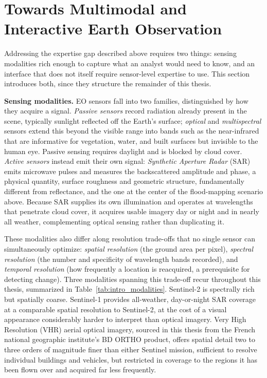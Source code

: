\section{Towards Multimodal and Interactive Earth Observation}
\label{sec:intro_multimodal_interactive}
 
Addressing the expertise gap described above requires two things: sensing modalities rich enough to capture what an analyst would need to know, and an interface that does not itself require sensor-level expertise to use. This section introduces both, since they structure the remainder of this thesis.
 
\textbf{Sensing modalities.} EO sensors fall into two families, distinguished by how they acquire a signal. \textit{Passive sensors} record radiation already present in the scene, typically sunlight reflected off the Earth's surface; \textit{optical} and \textit{multispectral} sensors extend this beyond the visible range into bands such as the near-infrared that are informative for vegetation, water, and built surfaces but invisible to the human eye. Passive sensing requires daylight and is blocked by cloud cover. \textit{Active sensors} instead emit their own signal: \textit{Synthetic Aperture Radar} (SAR) emits microwave pulses and measures the backscattered amplitude and phase, a physical quantity, surface roughness and geometric structure, fundamentally different from reflectance, and the one at the center of the flood-mapping scenario above. Because SAR supplies its own illumination and operates at wavelengths that penetrate cloud cover, it acquires usable imagery day or night and in nearly all weather, complementing optical sensing rather than duplicating it.
 
These modalities also differ along resolution trade-offs that no single sensor can simultaneously optimize: \textit{spatial resolution} (the ground area per pixel), \textit{spectral resolution} (the number and specificity of wavelength bands recorded), and \textit{temporal resolution} (how frequently a location is reacquired, a prerequisite for detecting change). Three modalities spanning this trade-off recur throughout this thesis, summarized in Table~\ref{tab:intro_modalities}. Sentinel-2 is spectrally rich but spatially coarse. Sentinel-1 provides all-weather, day-or-night SAR coverage at a comparable spatial resolution to Sentinel-2, at the cost of a visual appearance considerably harder to interpret than optical imagery. Very High Resolution (VHR) aerial optical imagery, sourced in this thesis from the French national geographic institute's BD ORTHO product, offers spatial detail two to three orders of magnitude finer than either Sentinel mission, sufficient to resolve individual buildings and vehicles, but restricted in coverage to the regions it has been flown over and acquired far less frequently.
 
